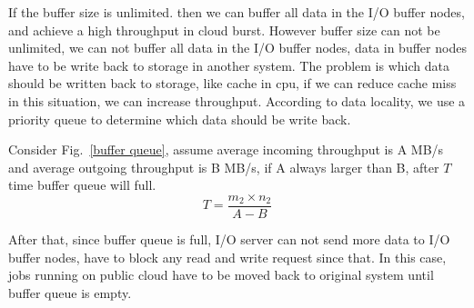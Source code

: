 If the buffer size is unlimited. then we can buffer all data in the I/O buffer nodes, and achieve a high throughput in cloud burst.
However buffer size can not be unlimited, we can not buffer all data in the I/O buffer nodes, data in buffer nodes have to be write back to storage in another system.
The problem is which data should be written back to storage, like cache in cpu, if we can reduce cache miss in this situation, we can increase throughput. 
According to data locality, we use a priority queue to determine which data should be write back.

Consider Fig.~\ref{buffer queue}, assume average incoming throughput is A MB/s and average outgoing throughput is B MB/s, if A always larger than B, after $T$ time buffer queue will full.
\[T=\frac{m_2\times n_2}{A-B}\]

After that, since buffer queue is full, I/O server can not send more data to I/O buffer nodes, have to block any read and write request since that.
In this case, jobs running on public cloud have to be moved back to original system until buffer queue is empty.
